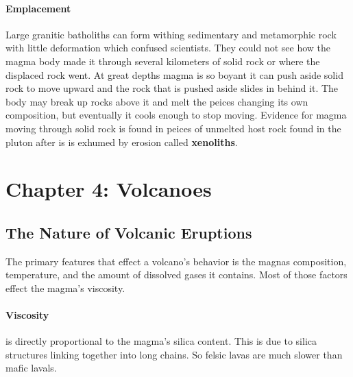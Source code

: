 \documentclass{article}
\begin{document}
\paragraph{Emplacement} %
\label{par:emplacement}
Large granitic batholiths can form withing sedimentary and metamorphic rock with little deformation which confused scientists. They could not see how the magma body made it through several kilometers of solid rock or where the displaced rock went. At great depths magma is so boyant it can push aside solid rock to move upward and the rock that is pushed aside slides in behind it. The body may break up rocks above it and melt the peices changing its own composition, but eventually it cools enough to stop moving. Evidence for magma moving through solid rock is found in peices of unmelted host rock found in the pluton after is is exhumed by erosion called \textbf{xenoliths}.


\section{Chapter 4: Volcanoes} %
\label{sec:chapter_4_volcanoes}
\subsection{The Nature of Volcanic Eruptions} %
\label{sub:the_nature_of_volcanic_eruptions}
The primary features that effect a volcano's behavior is the magnas composition, temperature, and the amount of dissolved gases it contains. Most of those factors effect the magma's viscosity.

\paragraph{Viscosity} %
\label{par:viscosity}
is directly proportional to the magma's silica content. This is due to silica structures linking together into long chains. So felsic lavas are much slower than mafic lavals.
\end{document}
